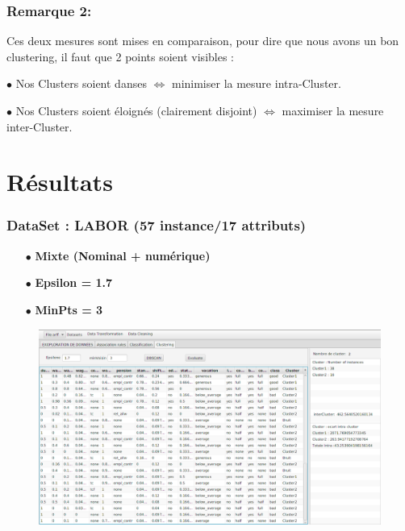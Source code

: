 \documentclass[12pt,a4paper,oneside]{book}
\begin{document}
\subsubsection*{Remarque 2:}
Ces deux mesures sont mises en comparaison, pour dire que nous avons un bon clustering, il faut que 2 points soient visibles :

$\bullet$ Nos Clusters soient danses $\Leftrightarrow$ minimiser la mesure intra-Cluster.


$\bullet$ Nos Clusters soient éloignés (clairement disjoint) $\Leftrightarrow$ maximiser la mesure inter-Cluster.
\newpage

\section{Résultats}
\subsubsection*{DataSet : LABOR (57 instance/17 attributs)}

\begin{itemize}
	\item[$\bullet$] \textbf{Mixte (Nominal + numérique)}
	\item[$\bullet$] \textbf{Epsilon = 1.7}
	\item[$\bullet$] \textbf{MinPts = 3}
\end{itemize}

\begin{figure}[H]
	\centering
	\includegraphics[scale=0.38]{images/dbscan1-2.png}
	\label{labelname}%
\end{figure}
\end{document}
